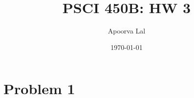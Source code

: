 \documentclass[12pt,reqno]{amsart}
\author{Apoorva Lal}
\title{PSCI 450B: HW 3}
\date{\today}
\begin{document}
\maketitle

\section*{Problem 1}

\lipsum


\renewcommand{\mkbibnamefamily}[1]{\textsc{#1}}
\printbibliography

\appendix
\end{document}
